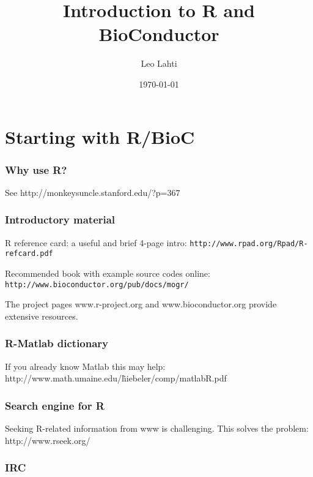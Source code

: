 \documentclass[10pt,a4paper]{article}
\title{Introduction to R and BioConductor}
\author{Leo Lahti}
\date{\today{}}
\begin{document}
\maketitle


\section{Starting with R/BioC}

\subsubsection*{Why use R?}

See http://monkeysuncle.stanford.edu/?p=367

\subsubsection*{Introductory material}

R reference card: a useful and brief 4-page intro: 
\texttt{http://www.rpad.org/Rpad/R-refcard.pdf}

Recommended book with example source codes online:
\texttt{http://www.bioconductor.org/pub/docs/mogr/}

The project pages www.r-project.org and www.bioconductor.org provide
extensive resources.

\subsubsection*{R-Matlab dictionary}

If you already know Matlab this may help:
http://www.math.umaine.edu/\~hiebeler/comp/matlabR.pdf

\subsubsection*{Search engine for R}

Seeking R-related information from www is challenging. This solves the
problem: http://www.rseek.org/


\subsubsection*{IRC}
\end{document}

